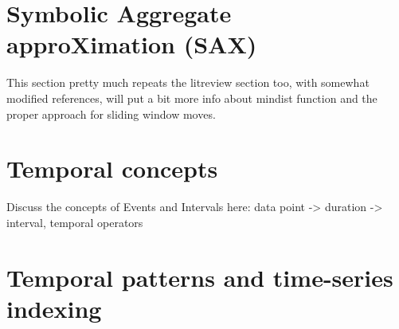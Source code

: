 \section{Symbolic Aggregate approXimation (SAX)}
This section pretty much repeats the litreview section too, with somewhat modified references, will put a bit more info about mindist function and the proper approach for sliding window moves.

\section{Temporal concepts}
Discuss the concepts of Events and Intervals here: data point -> duration -> interval, temporal operators

\section{Temporal patterns and time-series indexing}
